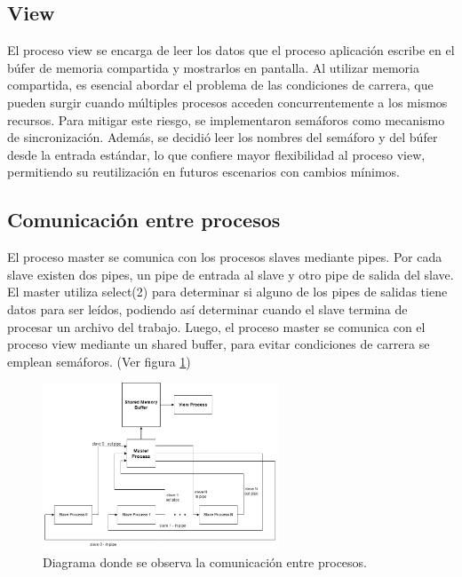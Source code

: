\documentclass{article}
\begin{document}
\subsection{View}

El proceso view se encarga de leer los datos que el proceso aplicación escribe en el búfer de memoria compartida y mostrarlos en pantalla. Al utilizar memoria compartida, es esencial abordar el problema de las condiciones de carrera, que pueden surgir cuando múltiples procesos acceden concurrentemente a los mismos recursos. Para mitigar este riesgo, se implementaron semáforos como mecanismo de sincronización. Además, se decidió leer los nombres del semáforo y del búfer desde la entrada estándar, lo que confiere mayor flexibilidad al proceso view, permitiendo su reutilización en futuros escenarios con cambios mínimos.

\subsection{Comunicación entre procesos}

El proceso master se comunica con los procesos slaves mediante pipes. Por cada slave existen dos pipes, un pipe de entrada al slave y otro pipe de salida del slave. El master utiliza select(2) para determinar si alguno de los pipes de salidas tiene datos para ser leídos, podiendo así determinar cuando el slave termina de procesar un archivo del trabajo. Luego, el proceso master se comunica con el proceso view mediante un shared buffer, para evitar condiciones de carrera se emplean semáforos. (Ver figura \ref{fig:diagramaComunicacion})

\begin{figure}[H]
\begin{center}
\includegraphics[width=70mm]{diagramaComunicacion}
\caption{Diagrama donde se observa la comunicación entre procesos.}
\label{fig:diagramaComunicacion}
\end{center}
\end{figure}
\end{document}
